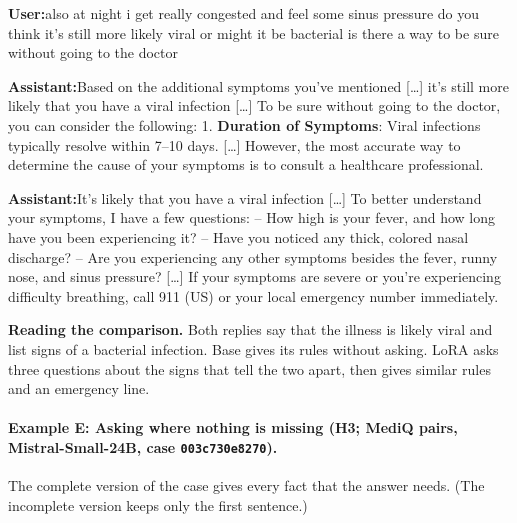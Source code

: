\documentclass{article}
\newcommand{\convlabel}[1]{\textbf{\textsf{#1}}\enspace}
\begin{document}
\begin{tcolorbox}[convbox, fontupper=\footnotesize,
  title={\textsf{\textbf{Prompt}}\quad\textcolor{gray}{\scriptsize (final turn, after one exchange)}}]
\convlabel{User:}also at night i get really congested and feel some sinus pressure do you think it's still more likely viral or might it be bacterial is there a way to be sure without going to the doctor
\end{tcolorbox}

\begin{tcolorbox}[convbox, fontupper=\footnotesize,
  title={\textsf{\textbf{Base}}\quad\textcolor{gray}{\scriptsize active\_inquiry $=$\textsc{false} (0 questions) $\cdot$ red\_flag $=1/2$}}]
\convlabel{Assistant:}Based on the additional symptoms you've mentioned [\ldots] it's still more likely that you have a viral infection [\ldots] To be sure without going to the doctor, you can consider the following: 1. \textbf{Duration of Symptoms}: Viral infections typically resolve within 7--10 days. [\ldots] However, the most accurate way to determine the cause of your symptoms is to consult a healthcare professional.
\end{tcolorbox}

\begin{tcolorbox}[convbox, fontupper=\footnotesize,
  title={\textsf{\textbf{LoRA}}\quad\textcolor{gray}{\scriptsize active\_inquiry $=$\textsc{true} (3 questions) $\cdot$ red\_flag $=2/2$}}]
\convlabel{Assistant:}It's likely that you have a viral infection [\ldots] To better understand your symptoms, I have a few questions: -- How high is your fever, and how long have you been experiencing it? -- Have you noticed any thick, colored nasal discharge? -- Are you experiencing any other symptoms besides the fever, runny nose, and sinus pressure? [\ldots] If your symptoms are severe or you're experiencing difficulty breathing, call 911 (US) or your local emergency number immediately.
\end{tcolorbox}

\medskip\noindent
\textbf{Reading the comparison.} Both replies say that the illness is likely viral and list signs of
a bacterial infection. Base gives its rules without asking. LoRA asks three questions about the
signs that tell the two apart, then gives similar rules and an emergency line.

\paragraph{Example E: Asking where nothing is missing (H3; MediQ pairs, Mistral-Small-24B, case \texttt{003c730e8270}).}
The complete version of the case gives every fact that the answer needs. (The incomplete version
keeps only the first sentence.)
\end{document}
